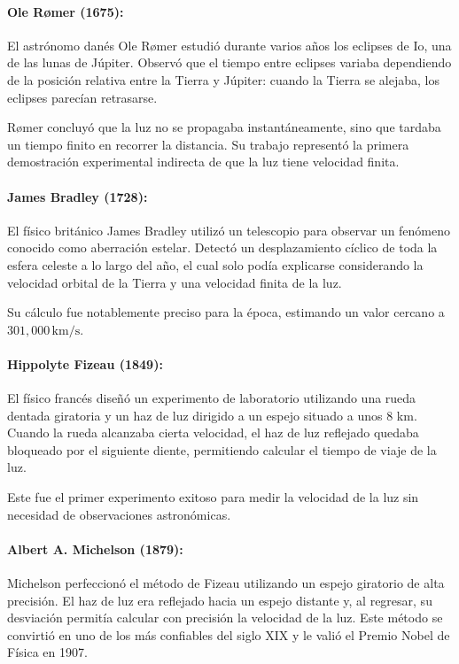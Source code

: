 \paragraph{Ole Rømer (1675):} El astrónomo danés Ole Rømer estudió durante varios años los eclipses de Io, una de las lunas de Júpiter. Observó que el tiempo entre eclipses variaba dependiendo de la posición relativa entre la Tierra y Júpiter: cuando la Tierra se alejaba, los eclipses parecían retrasarse.

Rømer concluyó que la luz no se propagaba instantáneamente, sino que tardaba un tiempo finito en recorrer la distancia. Su trabajo representó la primera demostración experimental indirecta de que la luz tiene velocidad finita.

\vspace{0.3cm}

\paragraph{James Bradley (1728):} El físico británico James Bradley utilizó un telescopio para observar un fenómeno conocido como aberración estelar. Detectó un desplazamiento cíclico de toda la esfera celeste a lo largo del año, el cual solo podía explicarse considerando la velocidad orbital de la Tierra y una velocidad finita de la luz.

Su cálculo fue notablemente preciso para la época, estimando un valor cercano a $301,000\,\mathrm{km/s}$.

\paragraph{Hippolyte Fizeau (1849):} El físico francés diseñó un experimento de laboratorio utilizando una rueda dentada giratoria y un haz de luz dirigido a un espejo situado a unos 8 km. Cuando la rueda alcanzaba cierta velocidad, el haz de luz reflejado quedaba bloqueado por el siguiente diente, permitiendo calcular el tiempo de viaje de la luz.

Este fue el primer experimento exitoso para medir la velocidad de la luz sin necesidad de observaciones astronómicas.

\paragraph{Albert A. Michelson (1879):} Michelson perfeccionó el método de Fizeau utilizando un espejo giratorio de alta precisión. El haz de luz era reflejado hacia un espejo distante y, al regresar, su desviación permitía calcular con precisión la velocidad de la luz. Este método se convirtió en uno de los más confiables del siglo XIX y le valió el Premio Nobel de Física en 1907.

